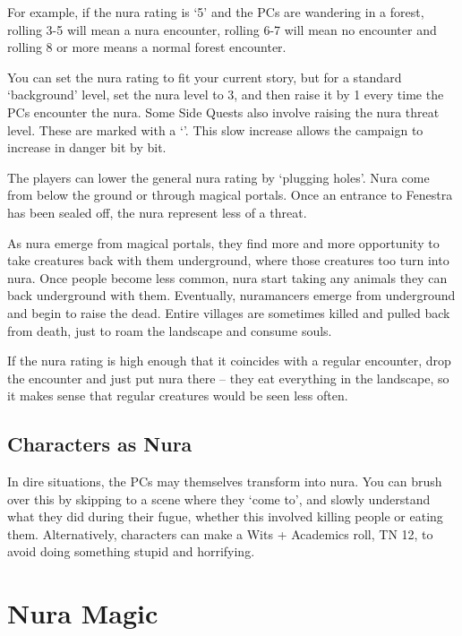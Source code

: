 \begin{multicols}{2}
For example, if the nura rating is `5' and the PCs are wandering in a forest, rolling 3-5 will mean a nura encounter, rolling 6-7 will mean no encounter and rolling 8 or more means a normal forest encounter.

You can set the nura rating to fit your current story, but for a standard `background' level, set the nura level to 3, and then raise it by 1 every time the PCs encounter the nura.
Some Side Quests also involve raising the nura threat level.  These are marked with a `\N'.
This slow increase allows the campaign to increase in danger bit by bit.

The players can lower the general nura rating by `plugging holes'.
Nura come from below the ground or through magical portals.
Once an entrance to Fenestra has been sealed off, the nura represent less of a threat.

As nura emerge from magical portals, they find more and more opportunity to take creatures back with them underground, where those creatures too turn into nura.  Once people become less common, nura start taking any animals they can back underground with them.  Eventually, nuramancers emerge from underground and begin to raise the dead.  Entire villages are sometimes killed and pulled back from death, just to roam the landscape and consume souls.

If the nura rating is high enough that it coincides with a regular encounter, drop the encounter and just put nura there -- they eat everything in the landscape, so it makes sense that regular creatures would be seen less often.

\subsection{Characters as Nura}

In dire situations, the PCs may themselves transform into nura.
You can brush over this by skipping to a scene where they `come to', and slowly understand what they did during their fugue, whether this involved killing people or eating them.
Alternatively, characters can make a Wits + Academics roll, TN 12, to avoid doing something stupid and horrifying.

\end{multicols}

\section{Nura Magic}\label{saurecanta}

